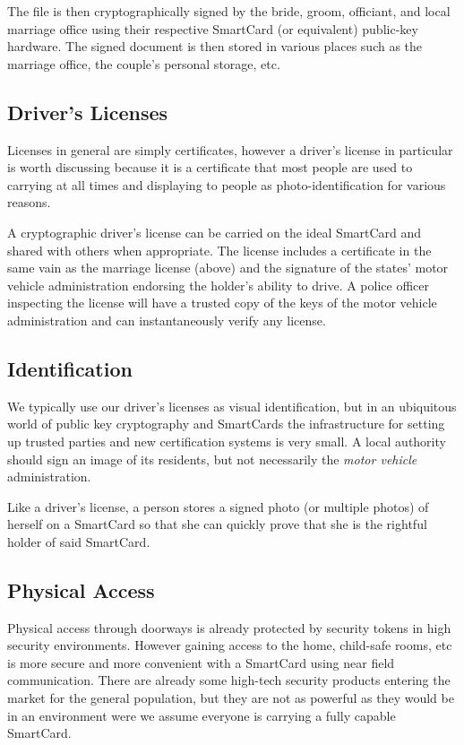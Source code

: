\documentclass[11pt, twocolumn]{article}
\begin{document}
The file is then cryptographically signed by the bride, groom, officiant, and
local marriage office using their respective SmartCard (or equivalent)
public-key hardware. The signed document is then stored in various places such
as the marriage office, the couple's personal storage, etc.

\subsection{Driver's Licenses}

Licenses in general are simply certificates, however a driver's license
in particular is worth discussing because it is a certificate that most people
are used to carrying at all times and displaying to people as
photo-identification for various reasons.

A cryptographic driver's license can be carried on the ideal SmartCard and
shared with others when appropriate. The license includes a certificate in the
same vain as the marriage license (above) and the signature of the states' motor
vehicle administration endorsing the holder's ability to drive. A police officer
inspecting the license will have a trusted copy of the keys of the motor vehicle
administration and can instantaneously verify any license.

\subsection{Identification}

We typically use our driver's licenses as visual identification, but in an
ubiquitous world of public key cryptography and SmartCards the infrastructure
for setting up trusted parties and new certification systems is very small. A
local authority should sign an image of its residents, but not necessarily the
\textit{motor vehicle} administration.

Like a driver's license, a person stores a signed photo (or multiple photos) of
herself on a SmartCard so that she can quickly prove that she is the rightful
holder of said SmartCard.

\subsection{Physical Access}

Physical access through doorways is already protected by security tokens in high
security environments. However gaining access to the home, child-safe rooms, etc
is more secure and more convenient with a SmartCard using near field
communication. There are already some high-tech security products entering the
market for the general population, but they are not as powerful as they would be
in an environment were we assume everyone is carrying a fully capable SmartCard.
\end{document}
